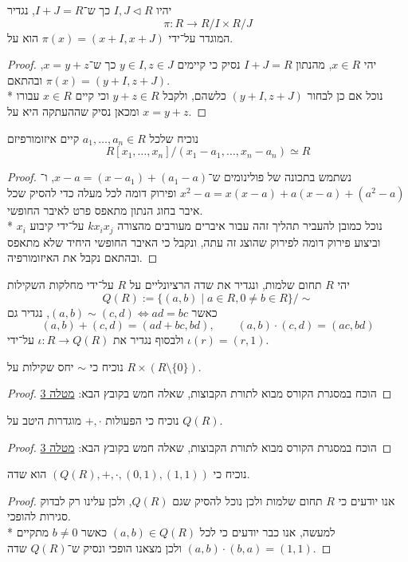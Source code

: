 \Subquestion{}
יהיו $I, J \triangleleft R$ כך ש־$I + J = R$, נגדיר
\[
	\pi : R \to R / I \times R / J
\]
המוגדר על־ידי $\pi(x) = (x + I, x + J)$ הוא על.
\begin{proof}
	יהי $x \in R$, מהנתון $I + J = R$ נסיק כי קיימים $y \in I, z \in J$ כך ש־$x = y + z$, ובהתאם $\pi(x) = (y + I, z + J)$. \\*
	נוכל אם כן לבחור $(y + I, z + J)$ כלשהם, ולקבל $y + z \in R$ וכי קיים $x \in R$ עבורו $x = y + z$ ומכאן נסיק שההעתקה היא על.
\end{proof}

\Subquestion{}
נוכיח שלכל $a_1, \dots, a_n \in R$ קיים איזומורפיזם
\[
	R[x_1, \dots, x_n] / (x_1 - a_1, \dots, x_n - a_n) \simeq R
\]
\begin{proof}
	נשתמש בתכונה של פולינומים ש־$x - a = (x - a_1) + (a_1 - a)$, ו־$x^2 - a = x(x - a) + a(x - a) + (a^2 - a)$ ופירוק דומה לכל מעלה כדי להסיק שכל איבר בחוג הנתון מתאפס פרט לאיבר החופשי. \\*
	נוכל כמובן להעביר תהליך זהה עבור איברים מעורבים מהצורה $k x_i x_j$ על־ידי קיבוע $x_i$ וביצוע פירוק דומה לפירוק שהוצג זה עתה, ונקבל כי האיבר החופשי היחיד שלא מתאפס ובהתאם נקבל את האיזומורפיה.
\end{proof}

\Question{}
יהי $R$ תחום שלמות, ונגדיר את שדה הרציונליים על $R$ על־ידי מחלקות השקילות
\[
	Q(R) := \{ (a, b) \mid a \in R, 0 \ne b \in R \} / \sim
\]
כאשר $(a, b) \sim (c, d) \iff ad = bc$, נגדיר גם
\[
	(a, b) + (c, d) = (ad + bc, bd),
	\qquad
	(a, b) \cdot (c, d) = (ac, bd)
\]
ולבסוף נגדיר את $\iota : R \to Q(R)$ על־ידי $\iota(r) = (r, 1)$.

\Subquestion{}
נוכיח כי $\sim$ יחס שקילות על $R \times (R \setminus \{ 0 \})$.
\begin{proof}
	הוכח במסגרת הקורס מבוא לתורת הקבוצות, שאלה חמש בקובץ הבא: \href{https://github.com/D95-waka/Math/blob/master/Set_Theory/bin/ex03.pdf}{מטלה 3}
\end{proof}

\Subquestion{}
נוכיח כי הפעולות $+, \cdot$ מוגדרות היטב על $Q(R)$.
\begin{proof}
	הוכח במסגרת הקורס מבוא לתורת הקבוצות, שאלה חמש בקובץ הבא: \href{https://github.com/D95-waka/Math/blob/master/Set_Theory/bin/ex03.pdf}{מטלה 3}
\end{proof}

\Subquestion{}
נוכיח כי $(Q(R), +, \cdot, (0, 1), (1, 1))$ הוא שדה.
\begin{proof}
	אנו יודעים כי $R$ תחום שלמות ולכן נוכל להסיק שגם $Q(R)$, ולכן עלינו רק לבדוק סגירות להופכי. \\*
	למעשה, אנו כבר יודעים כי לכל $(a, b) \in Q(R)$ כאשר $b \ne 0$ מתקיים $(a, b) \cdot (b, a) = (1, 1)$ ולכן מצאנו הופכי ונסיק ש־$Q(R)$ שדה.
\end{proof}

